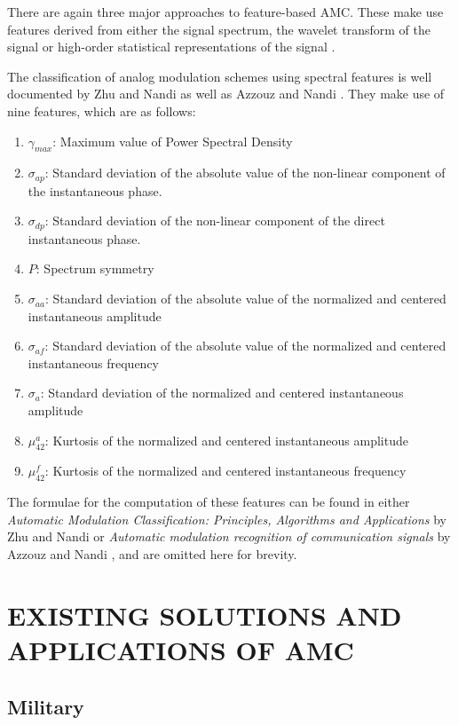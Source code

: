 \documentclass[10pt,twocolumn]{witseiepaper}
\begin{document}
	There are again three major approaches to feature-based AMC. These make use features derived from either the signal spectrum, the wavelet transform of the signal or high-order statistical representations of the signal \cite{zhu2014automatic}. 
	
	The classification of analog modulation schemes using spectral features is well documented by Zhu and Nandi \cite{zhu2014automatic} as well as Azzouz and Nandi \cite{azzouz2013automatic}. They make use of nine features, which are as follows:

	\begin{enumerate}
		\item $\gamma_{max}$: Maximum value of Power Spectral Density 
		\item $\sigma_{ap}$: Standard deviation of the absolute value of the non-linear component of the instantaneous phase.
		\item $\sigma_{dp}$: Standard deviation of the non-linear component of the direct instantaneous phase.
		\item $P$: Spectrum symmetry
		\item $\sigma_{aa}$: Standard deviation of the absolute value of the normalized and centered instantaneous amplitude
		\item $\sigma_{af}$: Standard deviation of the absolute value of the normalized and centered instantaneous frequency
		\item $\sigma_{a}$: Standard deviation of the normalized and centered instantaneous amplitude
		\item $\mu_{42}^{a}$: Kurtosis of the normalized and centered instantaneous amplitude
		\item $\mu_{42}^{f}$: Kurtosis of the normalized and centered instantaneous frequency
	\end{enumerate}

	The formulae for the computation of these features can be found in either \textit{Automatic Modulation Classification: Principles, Algorithms and Applications} by Zhu and Nandi \cite{zhu2014automatic} or \textit{Automatic modulation recognition of communication signals} by Azzouz and Nandi \cite{azzouz2013automatic}, and are omitted here for brevity.
	
\section{EXISTING SOLUTIONS AND APPLICATIONS OF AMC}
	\subsection{Military}
\end{document}
